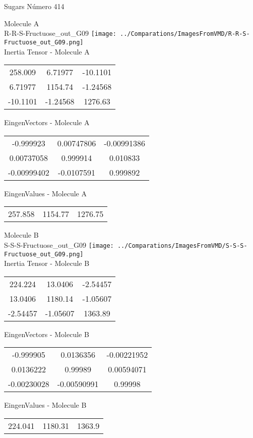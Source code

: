 \vtab[-2cm]
\begin{center}
{\large Sugars \tab Número 414}
\end{center}
\begin{multicols}{2}
\begin{center}

Molecule A \\ 
R-R-S-Fructuose\_out\_G09
\texttt{[image: ../Comparations/ImagesFromVMD/R-R-S-Fructuose\_out\_G09.png]}
\\
Inertia Tensor - Molecule A \\
\vtab

\begin{tabular}{|c c c|}
258.009	 & 	6.71977	 & 	-10.1101	 \\
6.71977	 & 	1154.74	 & 	-1.24568	 \\
-10.1101	 & 	-1.24568	 & 	1276.63
\end{tabular}

\vtab
 EingenVectors - Molecule A     \\
\vtab
\begin{tabular}{|c c c|}
-0.999923	 & 	0.00747806	 & 	-0.00991386	 \\
0.00737058	 & 	0.999914	 & 	0.010833	 \\
-0.00999402	 & 	-0.0107591	 & 	0.999892
\end{tabular}

\vtab
 EingenValues - Molecule A     \\
\vtab
\begin{tabular}{|c c c|}
257.858	 & 	1154.77	 & 	1276.75	 \\
\end{tabular}
\columnbreak

Molecule B \\ 
S-S-S-Fructuose\_out\_G09
\texttt{[image: ../Comparations/ImagesFromVMD/S-S-S-Fructuose\_out\_G09.png]}
\\
Inertia Tensor - Molecule B \\
\vtab

\begin{tabular}{|c c c|}
224.224	 & 	13.0406	 & 	-2.54457	 \\
13.0406	 & 	1180.14	 & 	-1.05607	 \\
-2.54457	 & 	-1.05607	 & 	1363.89
\end{tabular}

\vtab
 EingenVectors - Molecule B     \\
\vtab
\begin{tabular}{|c c c|}
-0.999905	 & 	0.0136356	 & 	-0.00221952	 \\
0.0136222	 & 	0.99989	 & 	0.00594071	 \\
-0.00230028	 & 	-0.00590991	 & 	0.99998
\end{tabular}

\vtab
 EingenValues - Molecule B     \\
\vtab
\begin{tabular}{|c c c|}
224.041	 & 	1180.31	 & 	1363.9	 \\
\end{tabular}

\end{center}
\end{multicols}
